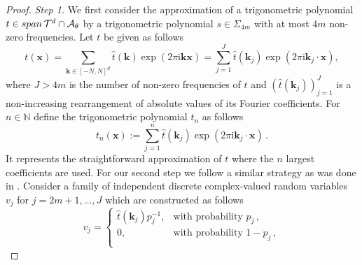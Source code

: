 \documentclass[11pt,reqno]{article}
\numberwithin{equation}{section}
\theoremstyle{definition}
\theoremstyle{plain}
\newcommand{\N}{\ensuremath{\mathbb{N}}}
\newcommand{\bk}{\ensuremath{\mathbf k}}
\newcommand{\bx}{\ensuremath{\mathbf x}}
\newcommand{\Span}{{\rm span \, }}
\newcommand{\be}{\begin{equation}}
\newcommand{\ee}{\end{equation}}
\begin{document}


\begin{proof} 
{\em Step 1.} We  first consider the approximation of a trigonometric polynomial \(t \in \Span \mathcal{T}^d \cap \mathcal{A}_{\theta}\) by a trigonometric polynomial \(s \in \Sigma_{4m}\) with at most \(4m\) non-zero frequencies. Let $t$ be given as follows 
\be \label{fdecomp}
t(\bx) = \sum_{\bk \in [-N,N]^d} \hat{t}(\bk) \exp(2 \pi \mathrm{i} \bk \bx) = \sum_{j =1}^{J} \hat{t}(\bk_j) \exp(2 \pi \mathrm{i} \bk_j \cdot \bx),
\ee
where \(J > 4m\) is the number of non-zero frequencies of \(t\) and \((\hat{t}(\bk_j))_{j=1}^J\) is a non-increasing rearrangement of absolute values of its Fourier coefficients. For $n\in \N$ define the trigonometric polynomial $t_{n}$ as follows
\be \label{half_approx}
    t_{n}(\bx):= \sum\limits_{j=1}^{n}\hat{t}(\bk_j) \exp(2 \pi \mathrm{i} \bk_j \cdot \bx)\,.
\ee
It represents the straightforward approximation of $t$ where the $n$ largest coefficients are used. 
For our second step we follow a similar strategy as was done in \cite[Lem.\ 2]{Mak84}. Consider a family of independent discrete complex-valued random variables \(v_j\) for \(j= 2m+1,\ldots,J\) which are constructed as follows
\begin{equation} \label{def_Rad}
        v_j = \begin{cases}
            \hat{t}(\bk_j) p_j^{-1}, & \text{with probability} \,\, p_j\,, \\
            0,& \text{with probability} \,\, 1-p_j\,, \\
        \end{cases}
\end{equation}


\end{proof}
\end{document}
